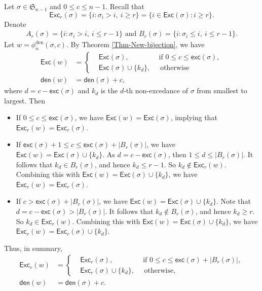 \documentclass[12pt]{article}
\begin{document}
Let $\sigma\in\mathfrak{S}_{n-1}$ and $0\leq c\leq n-1$.
Recall that
$$\textsf{Exc}_{r}(\sigma)=\{i:\sigma_{i}>i,\!~i\geq r\}=\{i\in\textsf{Exc}(\sigma):i\geq r\}.$$
Denote 
\vspace{-8pt}
\begin{align*}
A_{r}(\sigma)=\{i:\sigma_{i}>i,\!~i\leq r-1\}
\text{~and~}
B_{r}(\sigma)=\{i:\sigma_{i}\leq i,\!~i\leq r-1\}.
\end{align*}
Let $w=\phi_{n}^{\text{den}}(\sigma,c)$.
By Theorem \ref{Thm-New-bijection}, we have
\begin{align*}
	\textsf{Exc}(w)&=
	\left\{
	\begin{aligned}
		&\textsf{Exc}(\sigma), \quad\quad\quad\quad~\text{if~}0\leq c\leq \textsf{exc}(\sigma),\\
		&\textsf{Exc}(\sigma)\cup\{k_{d}\},\quad\text{~otherwise}
	\end{aligned}
	\right. \\
	\textsf{den}(w)&=\textsf{den}(\sigma)+c, 
\end{align*}
where $d=c-\textsf{exc}(\sigma)$ and $k_{d}$ is the $d$-th non-excedance of $\sigma$ from smallest to largest.
Then
\begin{itemize}
	\item[$\bullet$]If $0\leq c\leq \textsf{exc}(\sigma)$, we have
	$\textsf{Exc}(w)=\textsf{Exc}(\sigma)$,
	implying that $\textsf{Exc}_{r}(w)=\textsf{Exc}_{r}(\sigma)$.
	\item[$\bullet$]If $\textsf{exc}(\sigma)+1\leq c\leq \textsf{exc}(\sigma)+|B_{r}(\sigma)|$,
	we have $\textsf{Exc}(w)=\textsf{Exc}(\sigma)\cup\{k_{d}\}$.
	As $d=c-\textsf{exc}(\sigma)$, 
	then $1\leq d\leq |B_{r}(\sigma)|$. 
	It follows that $k_{d}\in B_{r}(\sigma)$, and hence $k_{d}\leq r-1$.
	So $k_{d}\notin\textsf{Exc}_{r}(w)$.
	Combining this with $\textsf{Exc}(w)=\textsf{Exc}(\sigma)\cup\{k_{d}\}$,
	we have $\textsf{Exc}_{r}(w)=\textsf{Exc}_{r}(\sigma)$.
	
	\item[$\bullet$]If $c>\textsf{exc}(\sigma)+|B_{r}(\sigma)|$,
	we have $\textsf{Exc}(w)=\textsf{Exc}(\sigma)\cup\{k_{d}\}$.
	Note that $d=c-\textsf{exc}(\sigma)>|B_{r}(\sigma)|$. 
	It follows that $k_{d}\notin B_{r}(\sigma)$,
	and hence $k_{d}\geq r$. 
    So $k_{d}\in \textsf{Exc}_{r}(w)$.
	Combining this with $\textsf{Exc}(w)=\textsf{Exc}(\sigma)\cup\{k_{d}\}$,
	we have $\textsf{Exc}_{r}(w)=\textsf{Exc}_{r}(\sigma)\cup\{k_{d}\}$.
\end{itemize}	
Thus, in summary, 
\begin{equation} \label{eq-Excr-den-Br}
	\begin{split}
		\textsf{Exc}_{r}(w)&=\left
		\{
		\begin{aligned}
			&\textsf{Exc}_{r}(\sigma), \quad\quad\quad\quad~\text{if~}0\leq c\leq \textsf{exc}(\sigma)+|B_{r}(\sigma)|,\\
			&\textsf{Exc}_{r}(\sigma)\cup\{k_{d}\},\quad\text{~otherwise,}
		\end{aligned}
		\right.\\
				\textsf{den}(w)&=\textsf{den}(\sigma)+c.
	\end{split}
\end{equation}
\end{document}
